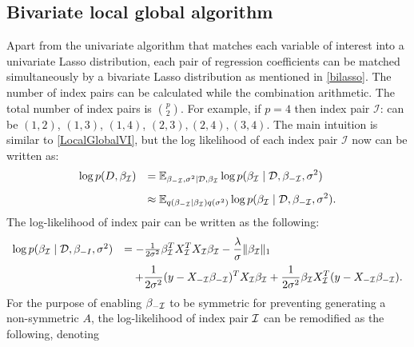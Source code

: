 \subsection{Bivariate local global algorithm}
Apart from the univariate algorithm that matches each variable of interest into a univariate Lasso distribution, each pair of regression coefficients can be matched simultaneously by a bivariate Lasso distribution as mentioned in \autoref{bilasso}.
The number of index pairs can be calculated while the combination arithmetic. The total number of index pairs is ${p}\choose{2}$. For example, if $p=4$ then index pair $\mathcal{I}$: can be $(1,2)$, $(1,3)$, $(1,4)$, $(2,3),(2,4), (3,4)$.
The main intuition is similar to \autoref{LocalGlobalVI}, but
the log likelihood of each index pair $\mathcal{I}$ now can be written as:
\begin{equation}
	\begin{array}{rl} 
		\log p(D,\beta_{\mathcal I}) 
		& \displaystyle = \mathbb{E}_{\beta_{-{\mathcal I}},\sigma^2\mid \mathcal{D},\beta_{\mathcal I}} \log p(\beta_{\mathcal I}\mid \mathcal{D},\beta_{-{\mathcal I}},\sigma^2)
		\\ [2ex]
		& \displaystyle \approx  \mathbb{E}_{q(\beta_{-{\mathcal I}}\mid\beta_{\mathcal I})q(\sigma^2)} \log p(\beta_{\mathcal I}\mid \mathcal{D},\beta_{-{\mathcal I}},\sigma^2).
		
	\end{array}
\end{equation}
The log-likelihood of index pair can be written as the following:
\begin{equation}
	\begin{array}{rl}
		\log p(\beta_{\mathcal I}\mid\mathcal{D},\beta_{-I},\sigma^2) 
		& \displaystyle = - \tfrac{1}{2\sigma^2}\beta_{\mathcal I}^TX_{\mathcal I}^TX_{\mathcal I}\beta_{\mathcal I} - \frac{\lambda}{\sigma} \|\beta_{{\mathcal I}} \|_1
		\\ [2ex]
		& \displaystyle \ \ \  
		+ \frac{1}{2\sigma^2}(y - X_{-{\mathcal I}}\beta_{-{\mathcal I}})^TX_{\mathcal I}\beta_{{\mathcal I}}
		+ \frac{1}{2\sigma^2}\beta_{{\mathcal I}}X_{\mathcal I}^T(y - X_{-{\mathcal I}}\beta_{-{\mathcal I}}).
		
	\end{array}
\end{equation}
For the purpose of enabling $\beta_{-{\mathcal I}}$ to be symmetric for preventing generating a non-symmetric $A$, the log-likelihood of index pair ${\mathcal I}$ can be remodified as the following, denoting \noindent 
